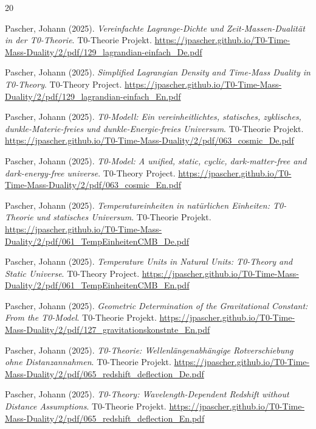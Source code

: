 	
	\begin{thebibliography}{20}
		
		Pascher, Johann (2025). 
		\textit{Vereinfachte Lagrange-Dichte und Zeit-Massen-Dualität in der T0-Theorie}. 
		T0-Theorie Projekt. 
		\url{https://jpascher.github.io/T0-Time-Mass-Duality/2/pdf/129_lagrandian-einfach_De.pdf}
		
		Pascher, Johann (2025). 
		\textit{Simplified Lagrangian Density and Time-Mass Duality in T0-Theory}. 
		T0-Theory Project. 
		\url{https://jpascher.github.io/T0-Time-Mass-Duality/2/pdf/129_lagrandian-einfach_En.pdf}
		
		Pascher, Johann (2025). 
		\textit{T0-Modell: Ein vereinheitlichtes, statisches, zyklisches, dunkle-Materie-freies und dunkle-Energie-freies Universum}. 
		T0-Theorie Projekt. 
		\url{https://jpascher.github.io/T0-Time-Mass-Duality/2/pdf/063_cosmic_De.pdf}
		
		Pascher, Johann (2025). 
		\textit{T0-Model: A unified, static, cyclic, dark-matter-free and dark-energy-free universe}. 
		T0-Theory Project. 
		\url{https://jpascher.github.io/T0-Time-Mass-Duality/2/pdf/063_cosmic_En.pdf}
		
		Pascher, Johann (2025). 
		\textit{Temperatureinheiten in natürlichen Einheiten: T0-Theorie und statisches Universum}. 
		T0-Theorie Projekt. 
		\url{https://jpascher.github.io/T0-Time-Mass-Duality/2/pdf/061_TempEinheitenCMB_De.pdf}
		
		Pascher, Johann (2025). 
		\textit{Temperature Units in Natural Units: T0-Theory and Static Universe}. 
		T0-Theory Project. 
		\url{https://jpascher.github.io/T0-Time-Mass-Duality/2/pdf/061_TempEinheitenCMB_En.pdf}
		
		Pascher, Johann (2025). 
		\textit{Geometric Determination of the Gravitational Constant: From the T0-Model}. 
		T0-Theorie Projekt. 
		\url{https://jpascher.github.io/T0-Time-Mass-Duality/2/pdf/127_gravitationskonstnte_En.pdf}
		
		Pascher, Johann (2025). 
		\textit{T0-Theorie: Wellenlängenabhängige Rotverschiebung ohne Distanzannahmen}. 
		T0-Theorie Projekt. 
		\url{https://jpascher.github.io/T0-Time-Mass-Duality/2/pdf/065_redshift_deflection_De.pdf}
		
		Pascher, Johann (2025). 
		\textit{T0-Theory: Wavelength-Dependent Redshift without Distance Assumptions}. 
		T0-Theorie Projekt. 
		\url{https://jpascher.github.io/T0-Time-Mass-Duality/2/pdf/065_redshift_deflection_En.pdf}
		

\end{thebibliography}
